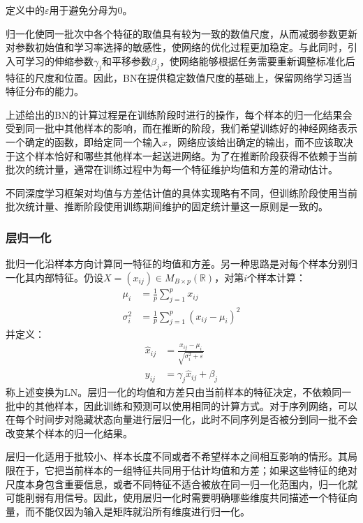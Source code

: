 定义中的$\varepsilon$用于避免分母为$0$。\par
归一化使同一批次中各个特征的取值具有较为一致的数值尺度，从而减弱参数更新对参数初始值和学习率选择的敏感性，使网络的优化过程更加稳定。与此同时，引入可学习的伸缩参数$\gamma_j$和平移参数$\beta_j$，使网络能够根据任务需要重新调整标准化后特征的尺度和位置。因此，BN在提供稳定数值尺度的基础上，保留网络学习适当特征分布的能力。
\begin{note}
	上述给出的BN的计算过程是在训练阶段时进行的操作，每个样本的归一化结果会受到同一批中其他样本的影响，而在推断的阶段，我们希望训练好的神经网络表示一个确定的函数，即给定同一个输入$x$，网络应该给出确定的输出，而不应该取决于这个样本恰好和哪些其他样本一起送进网络。为了在推断阶段获得不依赖于当前批次的统计量，通常在训练过程中为每一个特征维护均值和方差的滑动估计。\par
	不同深度学习框架对均值与方差估计值的具体实现略有不同，但训练阶段使用当前批次统计量、推断阶段使用训练期间维护的固定统计量这一原则是一致的。
\end{note}
\subsubsection{层归一化}
批归一化沿样本方向计算同一特征的均值和方差。另一种思路是对每个样本分别归一化其内部特征。仍设$X=(x_{ij})\in M_{B\times p}(\mathbb{R})$，对第$i$个样本计算：
\begin{align*}
	\mu_i&=\frac{1}{p}\sum_{j=1}^{p}x_{ij} \\
	\sigma_i^2&=\frac{1}{p}\sum_{j=1}^{p}(x_{ij}-\mu_i)^2
\end{align*}
并定义：
\begin{align*}
	\hat{x}_{ij}&=\frac{x_{ij}-\mu_i}{\sqrt{\sigma_i^2+\varepsilon}} \\
	y_{ij}&=\gamma_j\hat{x}_{ij}+\beta_j
\end{align*}
称上述变换为\gls{LN}。层归一化的均值和方差只由当前样本的特征决定，不依赖同一批中的其他样本，因此训练和预测可以使用相同的计算方式。对于序列网络，可以在每个时间步对隐藏状态向量进行层归一化，此时不同序列是否被分到同一批不会改变某个样本的归一化结果。

层归一化适用于批较小、样本长度不同或者不希望样本之间相互影响的情形。其局限在于，它把当前样本的一组特征共同用于估计均值和方差；如果这些特征的绝对尺度本身包含重要信息，或者不同特征不适合被放在同一归一化范围内，归一化就可能削弱有用信号。因此，使用层归一化时需要明确哪些维度共同描述一个特征向量，而不能仅因为输入是矩阵就沿所有维度进行归一化。

